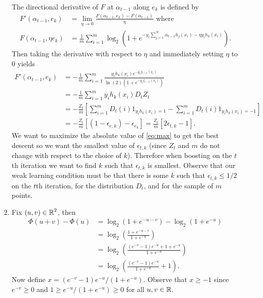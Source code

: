 \begin{enumerate}
\begin{enumerate}
    The directional derivative of $F$ at $\alpha_{t-1}$
    along $e_k$ is defined by
    \begin{align}
        F'(\alpha_{t-1},e_k) &= \lim_{\eta \rightarrow 0}
        \frac{F(\alpha_{t-1}, e_k) - F(\alpha_{t-1})}
        {\eta} 
        \textrm{ where} \nonumber \\
        F(\alpha_{t-1}, \eta e_k) &= \frac{1}{m}
        \sum_{i=1}^m \log_2(1+e^{-y_i \sum_{j=1}^N
        \alpha_{t-1}h_j(x_i) - \eta y_i h_k(x_i)}).
        \nonumber
    \end{align}
    Then taking the derivative with respect to $\eta$
    and immediately setting $\eta$ to 0 yields
    \begin{align}
        F'(\alpha_{t-1}, e_k) &=
        -\frac{1}{m} \sum_{i=1}^m
        \frac{y_i h_k(x_i) e^{-y_i f_{t-1}(x_i)}}
        {\ln(2)(1+e^{-y_i f_{t-1}(x_i)})} \nonumber \\
        &= -\frac{1}{m} \sum_{i=1}^m y_i h_k(x_i)
        D_t Z_t \nonumber \\
        &= -\frac{Z_t}{m} \left [
        \sum_{i=1}^m D_t(i) 1_{y_i h_k(x_i)=1}
        - \sum_{i=1}^m D_t(i) 1_{y_i h_k(x_i)=-1}
        \right] \nonumber \\
        &= -\frac{Z_t}{m} \left [
        (1-\epsilon_{e,k}) - \epsilon_{e_k}
        \right]
        = \frac{Z_t}{m} \left [
        2 \epsilon_{t,k} - 1
        \right ].
        \label{eq:max}
    \end{align}
    We want to maximize the absolute value
    of \autoref{eq:max} to get the best descent
    so we want the smallest value of $\epsilon_{t,k}$
    (since $Z_t$ and $m$ do not change with respect
    to the choice of $k$).
    Therefore when boosting on the $t$th iteration
    we want to find $k$ such that $\epsilon_{t,k}$
    is smallest.
    Observe that our weak learning condition must be
    that there is some $k$ such that
    $\epsilon_{t,k} \leq 1/2$ on the $t$th iteration,
    for the distribution $D_t$, and for the sample
    of $m$ points.

    \item Fix $(u,v) \in \operatorname*{\mathbb{R}}^2$, then
    \begin{align}
        \Phi(u+v) - \Phi(u) &= \log_2(1+e^{-u-v})
        - \log_2(1+e^{-u}) \nonumber \\
        &= \log_2 \left( \frac{1+e^{-u-v}}{1+e^{-u}}
        \right) \nonumber \\
        &= \log_2 \left( \frac{(e^{-v}-1)e^{-u} + 1+ e^{-u}}{1+e^{-u}}
        \right) \nonumber \\
        \label{eq:continuin}
        &= \log_2 \left( \frac{(e^{-v}-1)e^{-u}}{1+e^{-u}} +1
        \right).
    \end{align}
    Now define $x=(e^{-v}-1)e^{-u}/(1+e^{-u})$.
    Observe that $x\geq -1$ since $e^{-v} \geq 0$
    and $1 \geq e^{-u}/(1+e^{-u}) \geq 0$ for all $u,v \in \operatorname*{\mathbb{R}}$.


\end{enumerate}
\end{enumerate}
